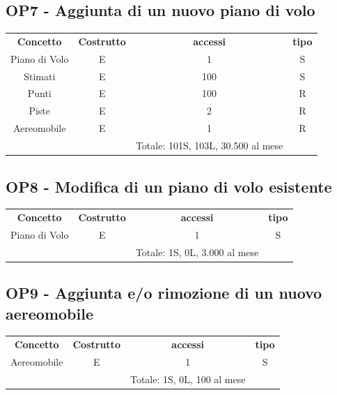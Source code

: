     \subsection*{OP7 - Aggiunta di un nuovo piano di volo}
    \begin{table}[H]
    \centering
    \begin{tabular}{cccc}
  
    \rowcolor{tableheadercolor}
    \textbf{Concetto} & \textbf{Costrutto} & \textbf{accessi} & \textbf{tipo}\\
  
    Piano di Volo & E & 1 & S \\
    Stimati & E & 100 & S \\
    Punti & E & 100 & R \\
    Piste & E & 2 & R \\
    Aereomobile & E & 1 & R \\
    & & Totale: 101S, 103L, 30.500 al mese &\\
  
    \end{tabular}
    \end{table}
  
    \subsection*{OP8 - Modifica di un piano di volo esistente}
    \begin{table}[H]
    \centering
    \begin{tabular}{cccc}
  
    \rowcolor{tableheadercolor}
    \textbf{Concetto} & \textbf{Costrutto} & \textbf{accessi} & \textbf{tipo}\\
  
    Piano di Volo & E & 1 & S \\\
    & & Totale: 1S, 0L, 3.000 al mese &\\
  
    \end{tabular}
    \end{table}

    \subsection*{OP9 - Aggiunta e/o rimozione di un nuovo aereomobile}
    \begin{table}[H]
    \centering
    \begin{tabular}{cccc}
  
    \rowcolor{tableheadercolor}
    \textbf{Concetto} & \textbf{Costrutto} & \textbf{accessi} & \textbf{tipo}\\
  
    Aereomobile & E & 1 & S \\\
    & & Totale: 1S, 0L, 100 al mese &\\
  
    \end{tabular}
    \end{table}

